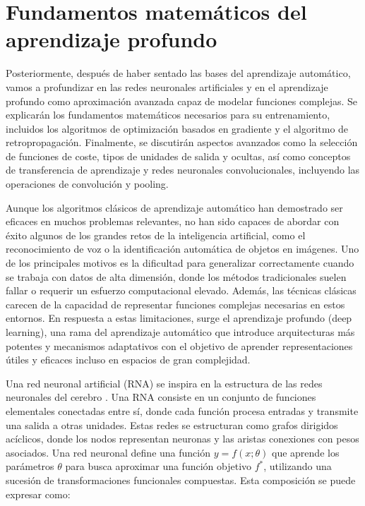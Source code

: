 
\chapter{Fundamentos matemáticos del aprendizaje profundo} \label{chap:dl-mates}
Posteriormente, después de haber sentado las bases del aprendizaje automático, vamos a profundizar en las redes neuronales artificiales y en el aprendizaje profundo como aproximación avanzada capaz de modelar funciones complejas. Se explicarán los fundamentos matemáticos necesarios para su entrenamiento, incluidos los algoritmos de optimización basados en gradiente y el algoritmo de retropropagación. Finalmente, se discutirán aspectos avanzados como la selección de funciones de coste, tipos de unidades de salida y ocultas, así como conceptos de transferencia de aprendizaje y redes neuronales convolucionales, incluyendo las operaciones de convolución y pooling.

Aunque los algoritmos clásicos de aprendizaje automático han demostrado ser eficaces en muchos problemas relevantes, no han sido capaces de abordar con éxito algunos de los grandes retos de la inteligencia artificial, como el reconocimiento de voz o la identificación automática de objetos en imágenes. Uno de los principales motivos es la dificultad para generalizar correctamente cuando se trabaja con datos de alta dimensión, donde los métodos tradicionales suelen fallar o requerir un esfuerzo computacional elevado. Además, las técnicas clásicas carecen de la capacidad de representar funciones complejas necesarias en estos entornos. En respuesta a estas limitaciones, surge el aprendizaje profundo (deep learning), una rama del aprendizaje automático que introduce arquitecturas más potentes y mecanismos adaptativos con el objetivo de aprender representaciones útiles y eficaces incluso en espacios de gran complejidad.

Una red neuronal artificial (RNA) se inspira en la estructura de las redes neuronales del cerebro \parencite{Goodfellow-et-al-2016}. Una RNA consiste en un conjunto de funciones elementales conectadas entre sí, donde cada función procesa entradas y transmite una salida a otras unidades. Estas redes se estructuran como grafos dirigidos acíclicos, donde los nodos representan neuronas y las aristas conexiones con pesos asociados. Una red neuronal define una función $y = f(x; \theta)$ que aprende los parámetros $\theta$ para busca aproximar una función objetivo $f^*$, utilizando una sucesión de transformaciones funcionales compuestas. Esta composición se puede expresar como:

